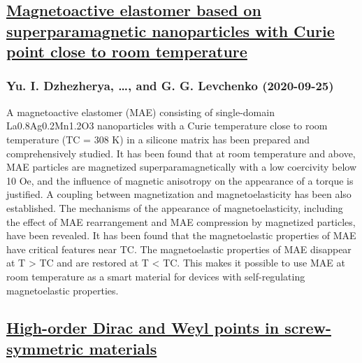\subsection*{\href{http://arxiv.org/abs/2009.12048v1}{Magnetoactive elastomer based on superparamagnetic nanoparticles with  Curie point close to room temperature}}
\subsubsection*{Yu. I. Dzhezherya, \dots, and G. G. Levchenko (2020-09-25)}
A magnetoactive elastomer (MAE) consisting of single-domain La0.8Ag0.2Mn1.2O3
nanoparticles with a Curie temperature close to room temperature (TC = 308 K)
in a silicone matrix has been prepared and comprehensively studied. It has been
found that at room temperature and above, MAE particles are magnetized
superparamagnetically with a low coercivity below 10 Oe, and the influence of
magnetic anisotropy on the appearance of a torque is justified. A coupling
between magnetization and magnetoelasticity has been also established. The
mechanisms of the appearance of magnetoelasticity, including the effect of MAE
rearrangement and MAE compression by magnetized particles, have been revealed.
It has been found that the magnetoelastic properties of MAE have critical
features near TC. The magnetoelastic properties of MAE disappear at T > TC and
are restored at T < TC. This makes it possible to use MAE at room temperature
as a smart material for devices with self-regulating magnetoelastic properties.

\subsection*{\href{http://arxiv.org/abs/2009.12036v1}{High-order Dirac and Weyl points in screw-symmetric materials}}
